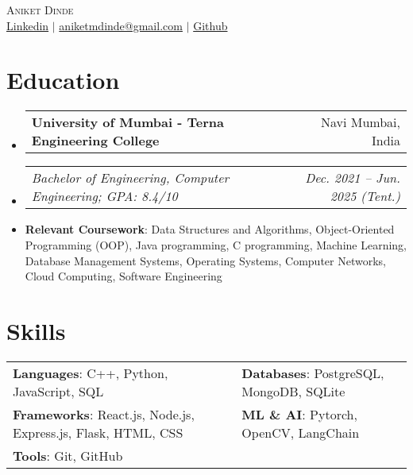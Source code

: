 \documentclass[letterpaper,10pt]{article}
\makeatletter
\newcommand{\resumeItem}[1]{
  \item\small{
    {#1 \vspace{-2pt}}
  }
}
\newcommand{\resumeSubheadingFirst}[2]{
  \vspace{-1pt}
  \item
    \begin{tabular*}{.97\textwidth}[t]{l@{\extracolsep{\fill}}r}
      \textbf{#1} & \small{#2}
    \end{tabular*}
    \vspace{-8pt}
}
\newcommand{\resumeSubheadingSecond}[2]{
  \item
    \begin{tabular*}{.97\textwidth}[t]{l@{\extracolsep{\fill}}r}
      \textit{\small#1} & \textit{\small #2}
    \end{tabular*}
    \vspace{-6pt}
}
\newcommand{\resumeSubHeadingListStart}{\begin{itemize}[leftmargin=0in, label={}]}
\newcommand{\resumeSubHeadingListEnd}{\end{itemize}}
\makeatother
\begin{document}

\begin{center}
    {\Huge \scshape Aniket Dinde} 
    \\ \vspace{4pt}
    \href{https://www.linkedin.com/in/aniketmdinde}
    {Linkedin}
    $|$ 
    \href{mailto:aniketmdinde@gmail.com}{aniketmdinde@gmail.com}
    $|$
    \href{https://github.com/aniketmdinde} 
    {Github}  
\end{center}


\section{Education}
  \resumeSubHeadingListStart
    \resumeSubheadingFirst{University of Mumbai - Terna Engineering College}{Navi Mumbai, India}
    \resumeSubheadingSecond{Bachelor of Engineering, Computer Engineering; GPA: 8.4/10}{Dec. 2021 -- Jun. 2025 (Tent.)}
      \resumeItem{\textbf{Relevant Coursework}: Data Structures and Algorithms, Object-Oriented Programming (OOP), Java programming, C programming, Machine Learning, Database Management Systems, Operating Systems, Computer Networks, Cloud Computing, Software Engineering }
  \resumeSubHeadingListEnd


%
 \section{Skills}
    \begin{itemize}[leftmargin=0in, label={}]
        {\item{
            \begin{tabular}{ l@{\hskip 0.2in} l }            
                \textbf{Languages}{: C++, Python, JavaScript, SQL} & 
                \textbf{Databases}{: PostgreSQL, MongoDB, SQLite} \\
                \textbf{Frameworks}{: React.js, Node.js, Express.js, Flask, HTML, CSS} & 
                \textbf{ML \& AI}{: Pytorch, OpenCV, LangChain} \\
                \textbf{Tools}{: Git, GitHub}
            \end{tabular}
        }}
    \end{itemize}
\vspace{-12pt}
\end{document}
